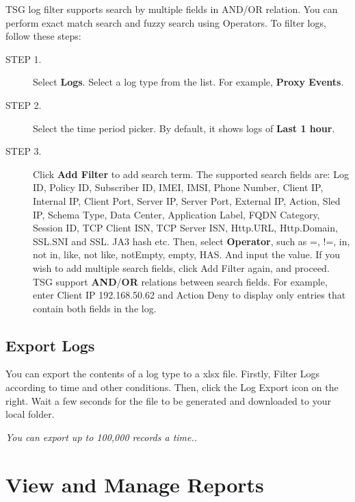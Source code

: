 TSG log filter supports search by multiple fields in AND/OR relation. You can perform exact match search and fuzzy search using Operators. To filter logs, follow these steps:

\begin{description}
    \item[STEP 1.]	Select \textbf{Logs}. Select a log type from the list. For example, \textbf{Proxy Events}.
    \item[STEP 2.]	Select the time period picker. By default, it shows logs of \textbf{Last 1 hour}.
    \item[STEP 3.]  Click \textbf{Add Filter} to add search term. The supported search fields are: Log ID, Policy ID, Subscriber ID, IMEI, IMSI, Phone Number, Client IP, Internal IP, Client Port, 
    Server IP, Server Port, External IP, Action, Sled IP, Schema Type, Data Center, Application Label, FQDN Category, Session ID, TCP Client ISN, TCP Server ISN, Http.URL, Http.Domain, SSL.SNI and SSL. JA3 hash etc. 
    Then, select \textbf{Operator}, such as =, !=, in, not in, like, not like, notEmpty, empty, HAS. And input the value. If you wish to add multiple search fields, click Add Filter again, and proceed. 
    TSG support \textbf{AND}/\textbf{OR} relations between search fields. For example, enter Client IP 192.168.50.62 and Action Deny to display only entries that contain both fields in the log. 
\end{description}

\subsection*{\hypertarget{link:Export Logs}{Export Logs}}
\label{sec:monitor:log:export}

You can export the contents of a log type to a xlsx file. Firstly, Filter Logs according to time and other conditions. 
Then, click the Log Export icon on the right. Wait a few seconds for the file to be generated and downloaded to your local folder. 


\notemark\textit{You can export up to 100,000 records a time..}

\section*{\hypertarget{link:View and Manage Reports}{View and Manage Reports}}
\label{sec:monitor:report}


